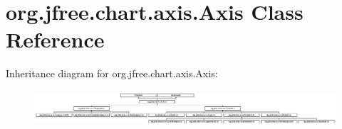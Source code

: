 \hypertarget{classorg_1_1jfree_1_1chart_1_1axis_1_1_axis}{}\section{org.\+jfree.\+chart.\+axis.\+Axis Class Reference}
\label{classorg_1_1jfree_1_1chart_1_1axis_1_1_axis}
Inheritance diagram for org.\+jfree.\+chart.\+axis.\+Axis\+:\begin{figure}[H]
\begin{center}
\leavevmode
\includegraphics[height=1.346154cm]{classorg_1_1jfree_1_1chart_1_1axis_1_1_axis}
\end{center}
\end{figure}
